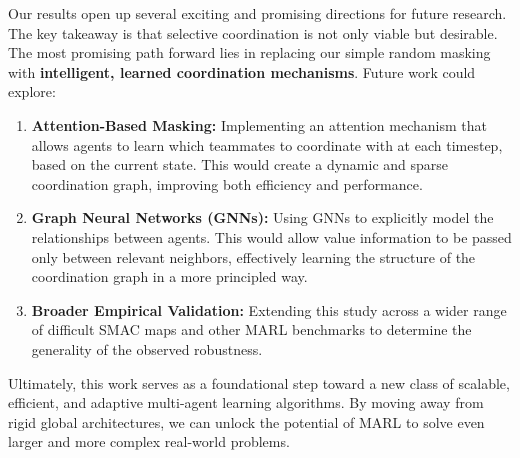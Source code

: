\documentclass[../Main.tex]{subfiles}
\begin{document}
Our results open up several exciting and promising directions for future research. The key takeaway is that selective coordination is not only viable but desirable. The most promising path forward lies in replacing our simple random masking with \textbf{intelligent, learned coordination mechanisms}. Future work could explore:

\begin{enumerate}
    \item \textbf{Attention-Based Masking:} Implementing an attention mechanism that allows agents to learn which teammates to coordinate with at each timestep, based on the current state. This would create a dynamic and sparse coordination graph, improving both efficiency and performance.

    \item \textbf{Graph Neural Networks (GNNs):} Using GNNs to explicitly model the relationships between agents. This would allow value information to be passed only between relevant neighbors, effectively learning the structure of the coordination graph in a more principled way.
    
    \item \textbf{Broader Empirical Validation:} Extending this study across a wider range of difficult SMAC maps and other MARL benchmarks to determine the generality of the observed robustness.
\end{enumerate}

Ultimately, this work serves as a foundational step toward a new class of scalable, efficient, and adaptive multi-agent learning algorithms. By moving away from rigid global architectures, we can unlock the potential of MARL to solve even larger and more complex real-world problems.




\biblio %
\end{document}
